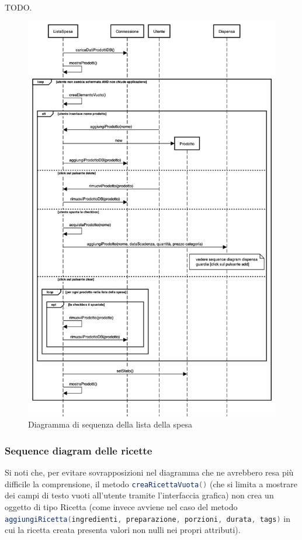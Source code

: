 \documentclass{article}
\newcommand{\inlinecode}[2]{{\lstinline[language=#1]$#2$}}
\begin{document}
TODO.

\begin{figure}[H]
    \includegraphics[width=\linewidth]{images/sequence-shopping-list.png}
    \caption{Diagramma di sequenza della lista della spesa}
    \label{fig:seqshoplist}
\end{figure}

\subsubsection{Sequence diagram delle ricette}

Si noti che, per evitare sovrapposizioni nel diagramma che ne avrebbero resa più difficile la comprensione, il metodo \inlinecode{Java}{creaRicettaVuota()} (che si limita a mostrare dei campi di testo vuoti all'utente tramite l'interfaccia grafica) non crea un oggetto di tipo Ricetta (come invece avviene nel caso del metodo \\ \inlinecode{Java}{aggiungiRicetta(ingredienti, preparazione, porzioni, durata, tags)} in cui la ricetta creata presenta valori non nulli nei propri attributi).
\end{document}
